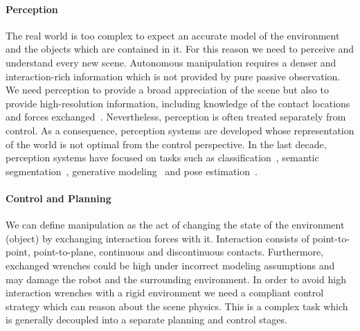 \paragraph{Perception} The real world is too complex to expect an accurate model of the environment and the objects which are contained in it. For this reason we need to perceive and understand every new scene. Autonomous manipulation requires a denser and interaction-rich information which is not provided by pure passive observation. We need perception to provide a broad appreciation of the scene but also to provide high-resolution information, including knowledge of the contact locations and forces exchanged~\cite{mason2018toward}. Nevertheless, perception is often treated separately from control. As a consequence, perception systems are developed whose representation of the world is not optimal from the control perspective. In the last decade, perception systems have focused on tasks such as classification~\citep{redmon2016you}, semantic segmentation~\cite{badrinarayanan2017segnet}, generative modeling~\citep{karras2019stylebased} and pose estimation~\cite{xiang2017posecnn}. 

\paragraph{Control and Planning} We can define manipulation as the act of changing the state of the environment (object) by exchanging interaction forces with it. Interaction consists of point-to-point, point-to-plane, continuous and discontinuous contacts. Furthermore, exchanged wrenches could be high under incorrect modeling assumptions and may damage the robot and the surrounding environment. In order to avoid high interaction wrenches with a rigid environment we need a compliant control strategy which can reason about the scene physics. This is a complex task which is generally decoupled into a separate planning and control stages.  



